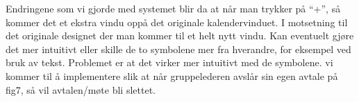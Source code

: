 Endringene som vi gjorde med systemet blir da at når man trykker på “+”, så kommer det et ekstra vindu oppå det originale kalendervinduet. I motsetning til det originale designet der man kommer til et helt nytt vindu. Kan eventuelt gjøre det mer intuitivt eller skille de to symbolene mer fra hverandre, for eksempel ved bruk av tekst. Problemet er at det virker mer intuitivt med de symbolene. vi kommer til å implementere slik at når gruppelederen avslår sin egen avtale på fig7, så vil avtalen/møte bli slettet.